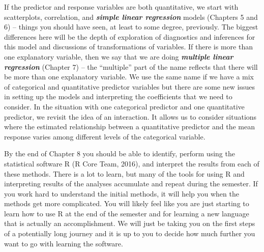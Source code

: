\documentclass[]{book}
\begin{document}
If the predictor and response variables are both quantitative, we start
with scatterplots, correlation, and \textbf{\emph{simple linear
regression}} models (Chapters 5 and 6) -- things you should have seen,
at least to some degree, previously. The biggest differences here will
be the depth of exploration of diagnostics and inferences for this model
and discussions of transformations of variables. If there is more than
one explanatory variable, then we say that we are doing
\textbf{\emph{multiple linear regression}} (Chapter 7) -- the
``multiple'' part of the name reflects that there will be more than one
explanatory variable. We use the same name if we have a mix of
categorical and quantitative predictor variables but there are some new
issues in setting up the models and interpreting the coefficients that
we need to consider. In the situation with one categorical predictor and
one quantitative predictor, we revisit the idea of an interaction. It
allows us to consider situations where the estimated relationship
between a quantitative predictor and the mean response varies among
different levels of the categorical variable.

By the end of Chapter 8 you should be able to identify, perform using
the statistical software R (R Core Team, 2016), and interpret the
results from each of these methods. There is a lot to learn, but many of
the tools for using R and interpreting results of the analyses
accumulate and repeat during the semester. If you work hard to
understand the initial methods, it will help you when the methods get
more complicated. You will likely feel like you are just starting to
learn how to use R at the end of the semester and for learning a new
language that is actually an accomplishment. We will just be taking you
on the first steps of a potentially long journey and it is up to you to
decide how much further you want to go with learning the software.
\end{document}
